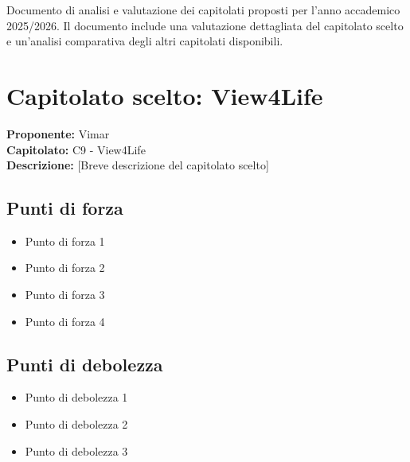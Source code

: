 \documentclass[a4paper,12pt]{article}
\begin{document}
\begin{center}
\begin{tcolorbox}[colback=secondaryblue!10,colframe=secondaryblue,width=0.9\textwidth,arc=3mm,boxrule=0.8pt,title={\bfseries Abstract}]
Documento di analisi e valutazione dei capitolati proposti per l'anno accademico 2025/2026. Il documento include una valutazione dettagliata del capitolato scelto e un'analisi comparativa degli altri capitolati disponibili.
\end{tcolorbox}
\end{center}

\newpage

\renewcommand{\cftsecpagefont}{\normalfont}
\renewcommand{\cftsecleader}{\cftdotfill{\cftsecdotsep}}
\setlength{\cftbeforesecskip}{2pt}
\begin{center}
\begin{tcolorbox}[colback=lightgray,colframe=darkgray,width=0.9\textwidth,arc=2mm,boxrule=0.5pt]
\tableofcontents
\end{tcolorbox}
\end{center}

\newpage

\section{Capitolato scelto: View4Life}

\begin{tcolorbox}[colback=secondaryblue!5,colframe=secondaryblue,arc=2mm,boxrule=0.5pt]
\textbf{Proponente:} Vimar \\
\textbf{Capitolato:} C9 - View4Life \\
\textbf{Descrizione:} [Breve descrizione del capitolato scelto]
\end{tcolorbox}

\subsection{Punti di forza}
\begin{itemize}
\item Punto di forza 1
\item Punto di forza 2
\item Punto di forza 3
\item Punto di forza 4
\end{itemize}

\subsection{Punti di debolezza}
\begin{itemize}
\item Punto di debolezza 1
\item Punto di debolezza 2
\item Punto di debolezza 3
\end{itemize}
\end{document}
